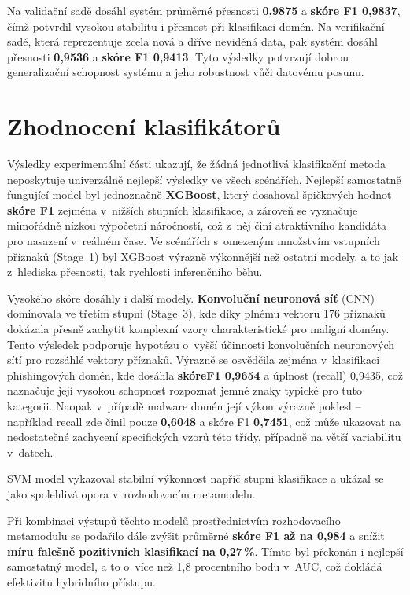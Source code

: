 Na validační sadě dosáhl systém průměrné přesnosti \textbf{0{,}9875} a \textbf{skóre F1 0{,}9837}, čímž potvrdil vysokou stabilitu i přesnost při klasifikaci domén. Na verifikační sadě, která reprezentuje zcela nová a dříve neviděná data, pak systém dosáhl přesnosti \textbf{0{,}9536} a \textbf{skóre F1 0{,}9413}. Tyto výsledky potvrzují dobrou generalizační schopnost systému a jeho robustnost vůči datovému posunu.


\section{Zhodnocení klasifikátorů}
\label{sec:discussion-evaluation}

Výsledky experimentální části ukazují, že žádná jednotlivá klasifikační metoda neposkytuje univerzálně nejlepší výsledky ve všech scénářích. Nejlepší samostatně fungující model byl jednoznačně \textbf{XGBoost}, který dosahoval špičkových hodnot \textbf{skóre F1} zejména v~nižších stupních klasifikace, a zároveň se vyznačuje mimořádně nízkou výpočetní náročností, což z~něj činí atraktivního kandidáta pro nasazení v~reálném čase. Ve scénářích s~omezeným množstvím vstupních příznaků (Stage~1) byl XGBoost výrazně výkonnější než ostatní modely, a to jak z~hlediska přesnosti, tak rychlosti inferenčního běhu.

Vysokého skóre dosáhly i další modely. \textbf{Konvoluční neuronová síť} (CNN) dominovala ve třetím stupni (Stage~3), kde díky plnému vektoru 176 příznaků dokázala přesně zachytit komplexní vzory charakteristické pro maligní domény. Tento výsledek podporuje hypotézu o~vyšší účinnosti konvolučních neuronových sítí pro rozsáhlé vektory příznaků. Výrazně se osvědčila zejména v~klasifikaci phishingových domén, kde dosáhla \textbf{skóreF1 0{,}9654} a úplnost (recall) 0{,}9435, což naznačuje její vysokou schopnost rozpoznat jemné znaky typické pro tuto kategorii. Naopak v~případě malware domén její výkon výrazně poklesl – například recall zde činil pouze \textbf{0{,}6048} a skóre F1 \textbf{0{,}7451}, což může ukazovat na nedostatečné zachycení specifických vzorů této třídy, případně na větší variabilitu v~datech. 

SVM model vykazoval stabilní výkonnost napříč stupni klasifikace a ukázal se jako spolehlivá opora v~rozhodovacím metamodelu.

Při kombinaci výstupů těchto modelů prostřednictvím rozhodovacího metamodulu se podařilo dále zvýšit průměrné \textbf{skóre F1 až na 0{,}984} a snížit \textbf{míru falešně pozitivních klasifikací na 0{,}27\,\%}. Tímto byl překonán i nejlepší samostatný model, a to o~více než 1{,}8 procentního bodu v~AUC, což dokládá efektivitu hybridního přístupu.

